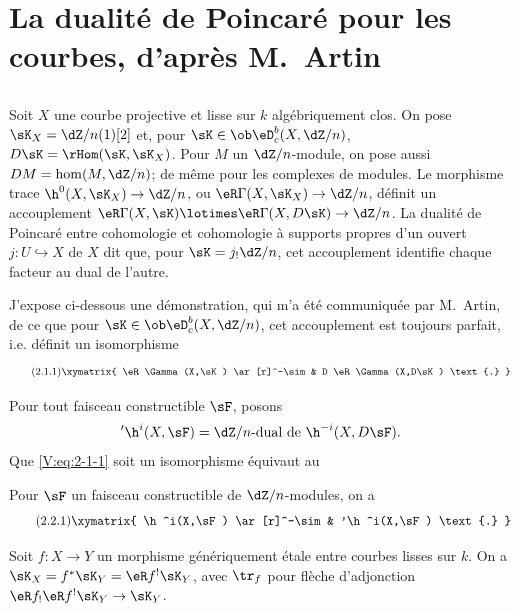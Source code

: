 \section{La dualité de Poincaré pour les courbes, d'après M.\ Artin}\label{V:2}





\subsection{}\label{V:2-1}

Soit $X$ une courbe projective et lisse sur $k$ algébriquement clos. On pose 
$\sK_X=\dZ/n(1)[2]$ et, pour $\sK\in\ob \eD_c^b(X,\dZ/n)$, 
$D\sK=\rHom(\sK,\sK_X)$. Pour $M$ un $\dZ/n$-module, on pose aussi 
$D M = \hom(M,\dZ/n)$; de même pour les complexes de modules. Le morphisme 
trace $\h^0(X,\sK_X) \to \dZ/n$, ou $\eR\Gamma(X,\sK_X)\to \dZ/n$, définit un 
accouplement $\eR\Gamma(X,\sK)\lotimes\eR\Gamma(X,D\sK) \to \dZ/n$. La dualité 
de Poincaré entre cohomologie et cohomologie à supports propres d'un ouvert 
$j:U\hookrightarrow X$ de $X$ dit que, pour $\sK=j_!\dZ/n$, cet accouplement 
identifie chaque facteur au dual de l'autre. 

J'expose ci-dessous une démonstration, qui m'a été communiquée par 
M.\ Artin, de ce que pour $\sK\in\ob\eD_c^b(X,\dZ/n)$, cet accouplement est 
toujours parfait, i.e. définit un isomorphisme
\begin{equation*}\tag{2.1.1}\label{V:eq:2-1-1}
\xymatrix{
  \eR\Gamma(X,\sK) \ar[r]^-\sim 
    & D \eR\Gamma(X,D\sK) \text{.}
}
\end{equation*}

Pour tout faisceau constructible $\sF$, posons 
\[
  '\h^i(X,\sF) = \text{$\dZ/n$-dual de $\h^{-i}(X,D\sF)$.}
\]
Que \eqref{V:eq:2-1-1} soit un isomorphisme équivaut au 





\begin{theorem_}\label{V:2-2}
Pour $\sF$ un faisceau constructible de $\dZ/n$-modules, on a 
\begin{equation*}\tag{2.2.1}\label{V:eq:2-2-1}
\xymatrix{
  \h^i(X,\sF) \ar[r]^-\sim 
    & '\h^i(X,\sF) \text{.}
}
\end{equation*}
\end{theorem_}





\begin{lemma_}\label{V:2-3}
Soit $f:X\to Y$ un morphisme génériquement étale entre courbes lisses sur 
$k$. On a $\sK_X=f^\ast\sK_Y=\eR f^!\sK_Y$, avec $\tr_f$ pour flèche 
d'adjonction $\eR f_!\eR f^!\sK_Y\to \sK_Y$.
\end{lemma_}

